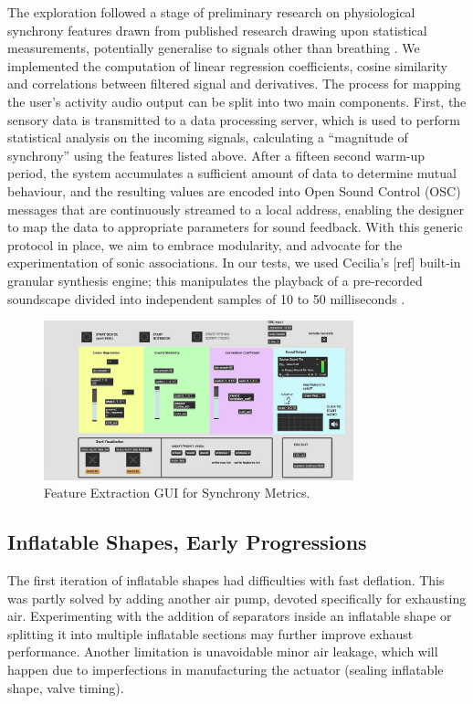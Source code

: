 The exploration followed a stage of preliminary research on physiological synchrony features drawn from published research drawing upon statistical measurements, potentially generalise to signals other than breathing \cite{zamm_endogenous_2016}. We implemented the computation of linear regression coefficients, cosine similarity and correlations between filtered signal and derivatives. The process for mapping the user’s activity audio output can be split into two main components. First, the sensory data is transmitted to a data processing server, which is used to perform statistical analysis on the incoming signals, calculating a “magnitude of synchrony” using the features listed above. After a fifteen second warm-up period, the system accumulates a sufficient amount of data to determine mutual behaviour, and the resulting values are encoded into Open Sound Control (OSC) messages that are continuously streamed to a local address, enabling the designer to map the data to appropriate parameters for sound feedback. With this generic protocol in place, we aim to embrace modularity, and advocate for the experimentation of sonic associations. In our tests, we used Cecilia’s [ref] built-in granular synthesis engine; this manipulates the playback of a pre-recorded soundscape divided into independent samples of 10 to 50 milliseconds \cite{roads_introduction_1988}.

\begin{figure}[htbp]
	\centering
	\includegraphics[width=0.8\textwidth]{Chapters/Figures/Feature_Extraction_Sync_MAX.jpg}
	\caption{Feature Extraction GUI for Synchrony Metrics.}
	\label{fig:feature_extraction_GUI}
\end{figure}

\subsection{Inflatable Shapes, Early Progressions}

The first iteration of inflatable shapes had difficulties with fast deflation. This was partly solved by adding another air pump, devoted specifically for exhausting air. Experimenting with the addition of separators inside an inflatable shape or splitting it into multiple inflatable sections may further improve exhaust performance. Another limitation is unavoidable minor air leakage, which will happen due to imperfections in manufacturing the actuator (sealing inflatable shape, valve timing).

